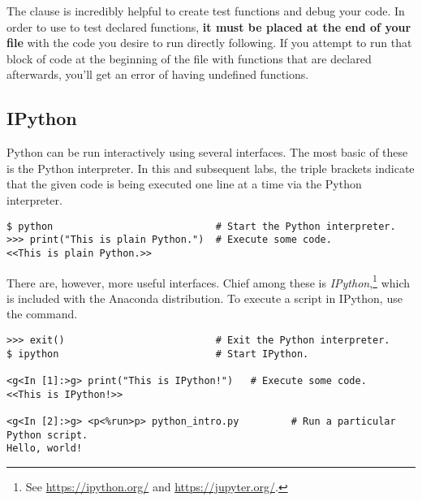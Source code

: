 \begin{warn} %
The \textbf{} clause is incredibly helpful to create test functions and debug your code. In order to use  to test declared functions, \textbf{it must be placed at the end of your file} with the code you desire to run directly following. If you attempt to run that block of code at the beginning of the file with functions that are declared afterwards, you'll get an error of having undefined functions. 
\end{warn}

\subsection*{IPython} %

Python can be run interactively using several interfaces.
The most basic of these is the Python interpreter.
In this and subsequent labs, the triple brackets \li{>>>} indicate that the given code is being executed one line at a time via the Python interpreter.

\begin{lstlisting}
$ python                            # Start the Python interpreter.
>>> print("This is plain Python.")  # Execute some code.
<<This is plain Python.>>
\end{lstlisting}

There are, however, more useful interfaces.
Chief among these is \emph{IPython},\footnote{See \url{https://ipython.org/} and \url{https://jupyter.org/}.} \cite{PER-GRA:2007,jupyter} which is included with the Anaconda distribution.
To execute a script in IPython, use the  command.

\begin{lstlisting}
>>> exit()                          # Exit the Python interpreter.
$ ipython                           # Start IPython.

<g<In [1]:>g> print("This is IPython!")   # Execute some code.
<<This is IPython!>>

<g<In [2]:>g> <p<%run>p> python_intro.py         # Run a particular Python script.
Hello, world!
\end{lstlisting}

